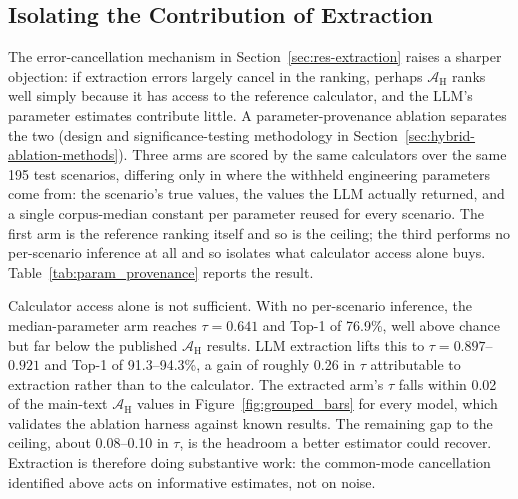 \documentclass[a4paper,fleqn]{cas-dc}
\begin{document}
\FloatBarrier
\subsection{Isolating the Contribution of Extraction}
\label{sec:res-paramprov}
The error-cancellation mechanism in Section~\ref{sec:res-extraction} raises a sharper objection: if extraction errors largely cancel in the ranking, perhaps $\mathcal{A}_{\text{H}}$ ranks well simply because it has access to the reference calculator, and the LLM's parameter estimates contribute little. A parameter-provenance ablation separates the two (design and significance-testing methodology in Section~\ref{sec:hybrid-ablation-methods}). Three arms are scored by the same calculators over the same 195 test scenarios, differing only in where the withheld engineering parameters come from: the scenario's true values, the values the LLM actually returned, and a single corpus-median constant per parameter reused for every scenario. The first arm is the reference ranking itself and so is the ceiling; the third performs no per-scenario inference at all and so isolates what calculator access alone buys. Table~\ref{tab:param_provenance} reports the result.

Calculator access alone is not sufficient. With no per-scenario inference, the median-parameter arm reaches $\tau = 0.641$ and Top-1 of 76.9\%, well above chance but far below the published $\mathcal{A}_{\text{H}}$ results. LLM extraction lifts this to $\tau = 0.897$--$0.921$ and Top-1 of 91.3--94.3\%, a gain of roughly 0.26 in $\tau$ attributable to extraction rather than to the calculator. The extracted arm's $\tau$ falls within 0.02 of the main-text $\mathcal{A}_{\text{H}}$ values in Figure~\ref{fig:grouped_bars} for every model, which validates the ablation harness against known results. The remaining gap to the ceiling, about 0.08--0.10 in $\tau$, is the headroom a better estimator could recover. Extraction is therefore doing substantive work: the common-mode cancellation identified above acts on informative estimates, not on noise.
\end{document}
